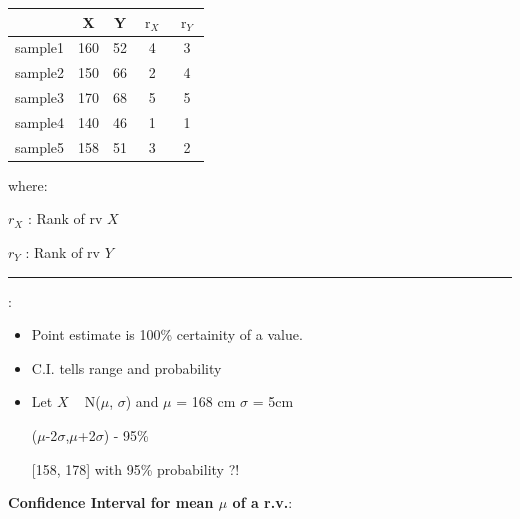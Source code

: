 \documentclass[	DIV=calc,%
paper=a4,%
fontsize=11pt,%
twocolumn]{scrartcl} %
\newcommand{\hformbar}[1]{\vspace{5pt}\hrule\vspace{10pt}} %
\newcommand{\formdesc}[1]{\noindent\textbf{#1}}
\begin{document}
\begin{itemize}
\begin{center}
	\begin{tabular}{ |c|c|c|c|c| } 
		\hline
		  & X & Y & $\operatorname{r}_X$ & $\operatorname{r}_Y$ \\
		  \hline
		sample1 & 160 & 52 & 4 & 3 \\ 
		sample2 & 150 & 66 & 2 & 4 \\
		sample3 & 170 & 68 & 5 & 5 \\
		sample4 & 140 & 46 & 1 & 1 \\
	    sample5 & 158 & 51 & 3 & 2 \\   
		\hline
	\end{tabular}
\end{center}


where:

${r} _{X}$ : Rank of rv $X$

${r} _{Y}$ :  Rank of rv $Y$

\end{itemize}


\hformbar

\formdesc{Confidence Interval}:

\begin{itemize}
	\item Point estimate is 100\% certainity of a value.
	\item C.I. tells range and probability
	\item Let $X$ ~ N($\mu$, $\sigma$) and $\mu$ = 168 cm $\sigma$ = 5cm
	
	($\mu$-2$\sigma$,$\mu$+2$\sigma$) - 95\%
	
	[158, 178] with 95\% probability ?!
\end{itemize}

\formdesc{Confidence Interval for mean $\mu$ of a r.v.}:
\end{document}
